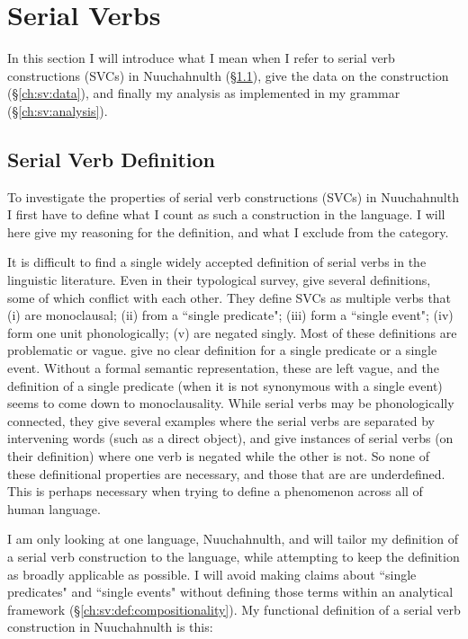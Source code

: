 \chapter{Serial Verbs} \label{ch:sv}

In this section I will introduce what I mean when I refer to serial verb constructions (SVCs) in Nuuchahnulth (\S\ref{ch:sv:def}), give the data on the construction (\S\ref{ch:sv:data}), and finally my analysis as implemented in my grammar (\S\ref{ch:sv:analysis}).

\section{Serial Verb Definition} \label{ch:sv:def}

To investigate the properties of serial verb constructions (SVCs) in Nuuchahnulth I first have to define what I count as such a construction in the language. I will here give my reasoning for the definition, and what I exclude from the category.

It is difficult to find a single widely accepted definition of serial verbs in the linguistic literature. Even in their typological survey, \cite{aikhenvalddixon2006} give several definitions, some of which conflict with each other. They define SVCs as multiple verbs that (i) are monoclausal; (ii) from a ``single predicate"; (iii) form a ``single event"; (iv) form one unit phonologically; (v) are negated singly. Most of these definitions are problematic or vague. \citeauthor{aikhenvalddixon2006} give no clear definition for a single predicate or a single event. Without a formal semantic representation, these are left vague, and the definition of a single predicate (when it is not synonymous with a single event) seems to come down to monoclausality. While serial verbs may be phonologically connected, they give several examples where the serial verbs are separated by intervening words (such as a direct object), and give instances of serial verbs (on their definition) where one verb is negated while the other is not. So none of these definitional properties are necessary, and those that are are underdefined. This is perhaps necessary when trying to define a phenomenon across all of human language.

I am only looking at one language, Nuuchahnulth, and will tailor my definition of a serial verb construction to the language, while attempting to keep the definition as broadly applicable as possible. I will avoid making claims about ``single predicates" and ``single events" without defining those terms within an analytical framework (\S\ref{ch:sv:def:compositionality}). My functional definition of a serial verb construction in Nuuchahnulth is this:

